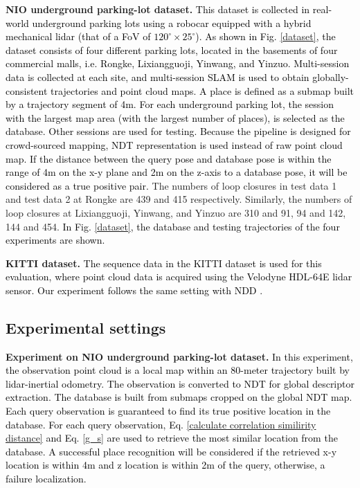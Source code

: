 \documentclass[letterpaper, 10 pt, conference]{ieeeconf}   %
\newcommand\kevin[1]{\textcolor{black}{#1}}
\begin{document}
\textbf{NIO underground parking-lot dataset.} \kevin{This dataset is collected in real-world underground parking lots using a robocar equipped with a hybrid mechanical lidar (that of a FoV of $ 120^{\circ} \times 25^{\circ}$). As shown in Fig. \ref{dataset}, the dataset consists of four different parking lots, located in the basements of four commercial malls, i.e. Rongke, Lixiangguoji, Yinwang, and Yinzuo. Multi-session data is collected at each site, and multi-session SLAM is used to obtain globally-consistent trajectories and point cloud maps. 
A place is defined as a submap built by a trajectory segment of 4m. 
For each underground parking lot, the session with the largest map area (with the largest number of places), is selected as the database. Other sessions are used for testing. Because the pipeline is designed for crowd-sourced mapping, NDT representation is used instead of raw point cloud map. If the distance between the query pose and database pose is within the range of 4m on the x-y plane and 2m on the z-axis to a database pose, it will be considered as a true positive pair.} The numbers of loop closures in test data 1 and test data 2 at Rongke are 439 and 415 respectively. Similarly, the numbers of loop closures at Lixiangguoji, Yinwang, and Yinzuo are 310 and 91, 94 and 142, 144 and 454.
\kevin{In Fig. \ref{dataset}, the database and testing trajectories of the four experiments are shown.}

\textbf{KITTI dataset.} \kevin{The sequence data in the KITTI dataset is used for this evaluation, where point cloud data is acquired using the Velodyne HDL-64E lidar sensor. Our experiment follows the same setting with NDD \cite{NDD}.}

\subsection{Experimental settings}

\textbf{Experiment on NIO underground parking-lot dataset.} \kevin{In this experiment, the observation point cloud is a local map within an 80-meter trajectory built by lidar-inertial odometry. The observation is converted to NDT for global descriptor extraction. The database is built from submaps cropped on the global NDT map. Each query observation is guaranteed to find its true positive location in the database. For each query observation, Eq. \ref{calculate correlation similirity distance} and Eq. \ref{g_s} are used to retrieve the most similar location from the database. A successful place recognition will be considered if the retrieved x-y location is within 4m and z location is within 2m of the query, otherwise, a failure localization.}
\end{document}
